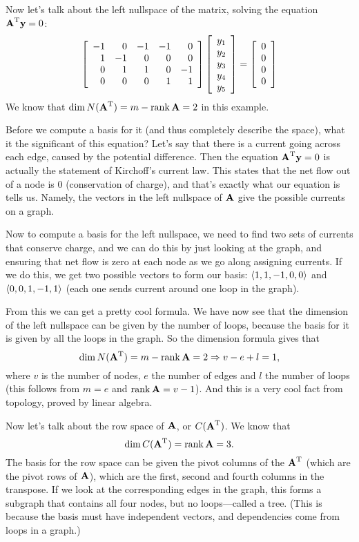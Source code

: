 Now let's talk about the left nullspace of the matrix, solving the equation $\boldsymbol{\mathbf{A}}^\mathrm{T}\boldsymbol{\mathbf{y}} = 0$:
\[ \left[ \begin{array}{rrrrrrrrrrrrrrrrrrrrrrrrr} -1&0&-1&-1&0\\1&-1&0&0&0\\0&1&1&0&-1\\0&0&0&1&1\\ \end{array} \right]\left[ \begin{array}{rrrrrrrrrrrrrrrrrrrrrrrrr} y_1\\y_2\\y_3\\y_4\\y_5\\ \end{array} \right] = \left[ \begin{array}{rrrrrrrrrrrrrrrrrrrrrrrrr} 0\\0\\0\\0\\ \end{array} \right] \]
We know that $\mathrm{dim}\, N(\boldsymbol{\mathbf{A}}^\mathrm{T}) = m - \mathrm{rank}\, \boldsymbol{\mathbf{A}} = 2$ in this example.

Before we compute a basis for it (and thus completely describe the space), what it the significant of this equation? Let's say that there is a current going across each edge, caused by the potential difference. Then the equation $\boldsymbol{\mathbf{A}}^\mathrm{T}\boldsymbol{\mathbf{y}} = 0$ is actually the statement of Kirchoff's current law. This states that the net flow out of a node is 0 (conservation of charge), and that's exactly what our equation is tells us. Namely, the vectors in the left nullspace of $\boldsymbol{\mathbf{A}}$ give the possible currents on a graph. 

Now to compute a basis for the left nullspace, we need to find two sets of currents that conserve charge, and we can do this by just looking at the graph, and ensuring that net flow is zero at each node as we go along assigning currents. If we do this, we get two possible vectors to form our basis: $\langle 1,1,-1,0,0 \rangle$ and $\langle 0,0,1,-1,1 \rangle$ (each one sends current around one loop in the graph).

From this we can get a pretty cool formula. We have now see that the dimension of the left nullspace can be given by the number of loops, because the basis for it is given by all the loops in the graph. So the dimension formula gives that
\[ \mathrm{dim}\, N(\boldsymbol{\mathbf{A}}^\mathrm{T}) = m - \mathrm{rank}\, \boldsymbol{\mathbf{A}} = 2 \Rightarrow v - e + l = 1, \]
where $v$ is the number of nodes, $e$ the number of edges and $l$ the number of loops (this follows from $m = e$ and $\mathrm{rank}\, \boldsymbol{\mathbf{A}} = v - 1$). And this is a very cool fact from topology, proved by linear algebra. 

Now let's talk about the row space of $\boldsymbol{\mathbf{A}}$, or $C(\boldsymbol{\mathbf{A}}^\mathrm{T})$. We know that
\[ \mathrm{dim}\, C(\boldsymbol{\mathbf{A}}^\mathrm{T}) = \mathrm{rank}\, \boldsymbol{\mathbf{A}} = 3. \]
The basis for the row space can be given the pivot columns of the $\boldsymbol{\mathbf{A}}^\mathrm{T}$ (which are the pivot rows of $\boldsymbol{\mathbf{A}}$), which are the first, second and fourth columns in the transpose. If we look at the corresponding edges in the graph, this forms a subgraph that contains all four nodes, but no loops---called a tree. (This is because the basis must have independent vectors, and dependencies come from loops in a graph.)
\eex